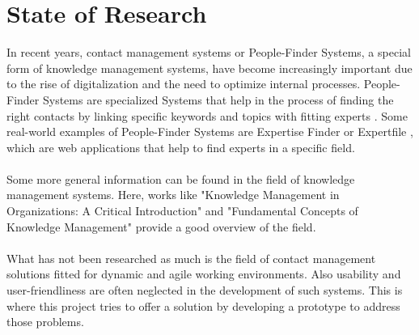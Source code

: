 \newpage
\section{State of Research} 

In recent years, contact management systems or People-Finder Systems, a special form of knowledge management systems, have become increasingly 
important due to the rise of digitalization and the need to optimize internal processes. People-Finder Systems are specialized 
Systems that help in the process of finding the right contacts by linking specific keywords and topics with fitting experts \cite{becerra-fernandez_facilitating_nodate}.
Some real-world examples of People-Finder Systems are Expertise Finder \cite{noauthor_expertise_nodate} or Expertfile \cite{noauthor_expertfile_nodate}, which are web 
applications that help to find experts in a specific field.\\ \\
Some more general information can be found in the field of knowledge management systems. Here, works like "Knowledge Management in Organizations: A Critical Introduction" \cite{hislop2018knowledge} and "Fundamental Concepts of Knowledge Management" \cite{Schneider2009} 
provide a good overview of the field.\\ \\
What has not been researched as much is the field of contact management solutions fitted for dynamic and agile working environments. Also usability and user-friendliness are often neglected in the development of such systems.
This is where this project tries to offer a solution by developing a prototype to address those problems.\\
